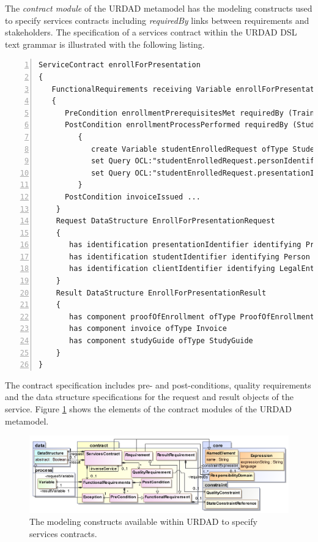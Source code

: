 The \emph{contract module} of the URDAD metamodel has the modeling constructs used to specify services contracts including \emph{requiredBy} links between requirements and stakeholders. The specification of a services contract within the URDAD DSL text grammar is illustrated with the following listing.
\lstset{language=urdad,caption=Specifying a service contract in the textual URDAD DSL syntax.,label=contractTextSyntax}
\begin{lstlisting}[numbers=left,escapechar=|]
ServiceContract enrollForPresentation
{
   FunctionalRequirements receiving Variable enrollForPresentationRequest ofType EnrollForPresentationRequest
   {
      PreCondition enrollmentPrerequisitesMet requiredBy (TrainingRegulator Student) raises EnrollmentPrerequisitesNotSatisfiedException checks constraint enrollmentPrerequisitesForPresentationMet with ValueOf enrollForPresentationRequest
      PostCondition enrollmentProcessPerformed requiredBy (Student Client TrainingRegulator) ensures constraint studentEnrolledForPresentation          with ValueOf studentEnrolledRequest constructedUsing doSequential
         {
            create Variable studentEnrolledRequest ofType StudentEnrolledRequest
            set Query OCL:"studentEnrolledRequest.personIdentifier" equalTo Query OCL:"enrollForPresentationRequest.personIdentifier"                            
            set Query OCL:"studentEnrolledRequest.presentationIdentifier" equalTo Query OCL:"enrollForPresentationRequest.presentationIdentifier"                            
         }  
      PostCondition invoiceIssued ...
    }            
    Request DataStructure EnrollForPresentationRequest 
    {
       has identification presentationIdentifier identifying Presentation
       has identification studentIdentifier identifying Person
       has identification clientIdentifier identifying LegalEntity         
    }
    Result DataStructure EnrollForPresentationResult 
    {
       has component proofOfEnrollment ofType ProofOfEnrollment
       has component invoice ofType Invoice
       has component studyGuide ofType StudyGuide
    }
}
\end{lstlisting}

The contract specification includes pre- and post-conditions, quality requirements and the data structure specifications for the request and result objects of the service. Figure \ref{fig:contractModule} shows the elements of the contract modules of the URDAD metamodel.

\begin{figure}[Htbp]
  \centering
  \includegraphics{contract}
  \caption{The modeling constructs available within URDAD to specify services contracts.}
  \label{fig:contractModule}
\end{figure}

